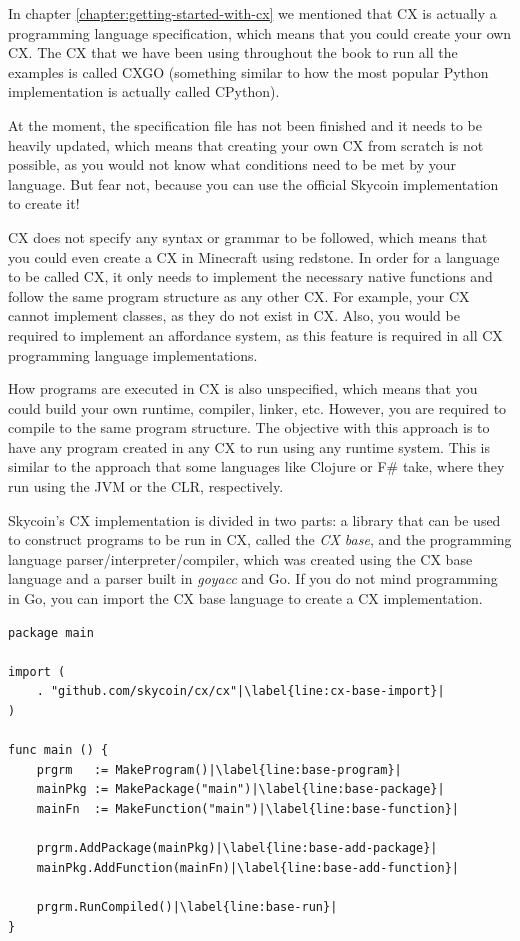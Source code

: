 \documentclass[11pt,fleqn,openany]{book} %
\begin{document}
In chapter \ref{chapter:getting-started-with-cx} we mentioned that CX is actually a programming language specification, which means that you could create your own CX. The CX that we have been using throughout the book to run all the examples is called CXGO (something similar to how the most popular Python implementation is actually called CPython).

At the moment, the specification file has not been finished and it needs to be heavily updated, which means that creating your own CX from scratch is not possible, as you would not know what conditions need to be met by your language. But fear not, because you can use the official Skycoin implementation to create it!

CX does not specify any syntax or grammar to be followed, which means that you could even create a CX in Minecraft using redstone. In order for a language to be called CX, it only needs to implement the necessary native functions and follow the same program structure as any other CX. For example, your CX cannot implement classes, as they do not exist in CX. Also, you would be required to implement an affordance system, as this feature is required in all CX programming language implementations.

How programs are executed in CX is also unspecified, which means that you could build your own runtime, compiler, linker, etc. However, you are required to compile to the same program structure. The objective with this approach is to have any program created in any CX to run using any runtime system. This is similar to the approach that some languages like Clojure or F\# take, where they run using the JVM or the CLR, respectively.

Skycoin's CX implementation is divided in two parts: a library that can be used to construct programs to be run in CX, called the \emph{CX base}, and the programming language parser/interpreter/compiler, which was created using the CX base language and a parser built in \emph{goyacc} and Go. If you do not mind programming in Go, you can import the CX base language to create a CX implementation.

\begin{lstlisting}[caption={Writing a program using CX base language},captionpos=b,label={listing:cx-base-program}]
package main

import (
	. "github.com/skycoin/cx/cx"|\label{line:cx-base-import}|
)

func main () {
	prgrm   := MakeProgram()|\label{line:base-program}|
	mainPkg := MakePackage("main")|\label{line:base-package}|
	mainFn  := MakeFunction("main")|\label{line:base-function}|

	prgrm.AddPackage(mainPkg)|\label{line:base-add-package}|
	mainPkg.AddFunction(mainFn)|\label{line:base-add-function}|

	prgrm.RunCompiled()|\label{line:base-run}|
}
\end{lstlisting}
\end{document}
